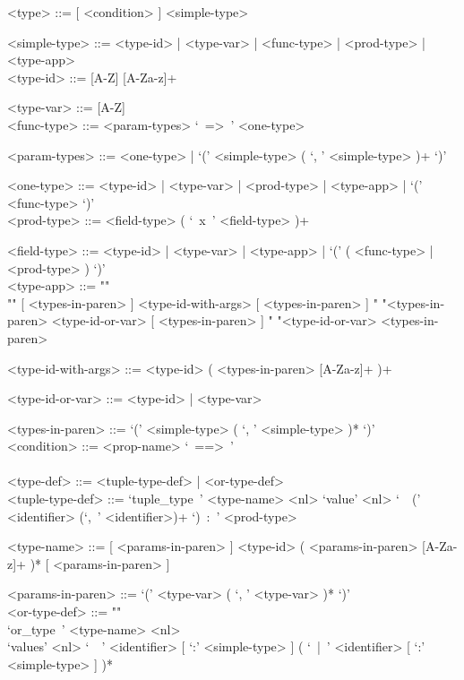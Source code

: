 \documentclass{article}
\begin{document}
\begin{grammar}
<type> ::= [ <condition> ]  <simple-type> 

<simple-type> ::= <type-id> | <type-var> | <func-type> | <prod-type> | <type-app>
\\

<type-id> ::= [A-Z] [A-Za-z]+ 

<type-var> ::= [A-Z]
\\

<func-type> ::= <param-types> `\ =>\ ' <one-type>

<param-types> ::= <one-type> | `(' <simple-type> ( `, ' <simple-type> )+ `)'

<one-type> ::=
<type-id> | <type-var> | <prod-type> | <type-app> | `(' <func-type> `)'
\\

<prod-type> ::= <field-type> ( `\ x\ ' <field-type> )+

<field-type> ::=
<type-id> | <type-var> | <type-app> | `(' ( <func-type> | <prod-type> ) `)'
\\

<type-app> ::= ""\\""
[ <types-in-paren> ] <type-id-with-args> [ <types-in-paren> ]
\alt " "<types-in-paren> <type-id-or-var> [ <types-in-paren> ]
\alt " "<type-id-or-var> <types-in-paren>

<type-id-with-args> ::= <type-id> ( <types-in-paren> [A-Za-z]+ )+

<type-id-or-var> ::= <type-id> | <type-var>

<types-in-paren> ::= `(' <simple-type> ( `, ' <simple-type> )* `)'
\\

<condition> ::= <prop-name> `\ ==>\ ' 
\\
\\

<type-def> ::= <tuple-type-def> | <or-type-def>
\\

<tuple-type-def> ::=
`tuple_type\ ' <type-name> <nl>
`value' <nl> `\ \ (' <identifier> (`,\ ' <identifier>)+ `)\ :\ ' <prod-type>

<type-name> ::= 
[ <params-in-paren> ] <type-id> ( <params-in-paren> [A-Za-z]+ )*
[ <params-in-paren> ]

<params-in-paren> ::= `(' <type-var> ( `, ' <type-var> )* `)'
\\

<or-type-def> ::= ""\\
`or_type\ ' <type-name> <nl> \\
`values' <nl> `\ \ ' <identifier> [ `:' <simple-type> ]
( `\ |\ ' <identifier> [ `:' <simple-type> ] )*
\\


\end{grammar}
\end{document}
